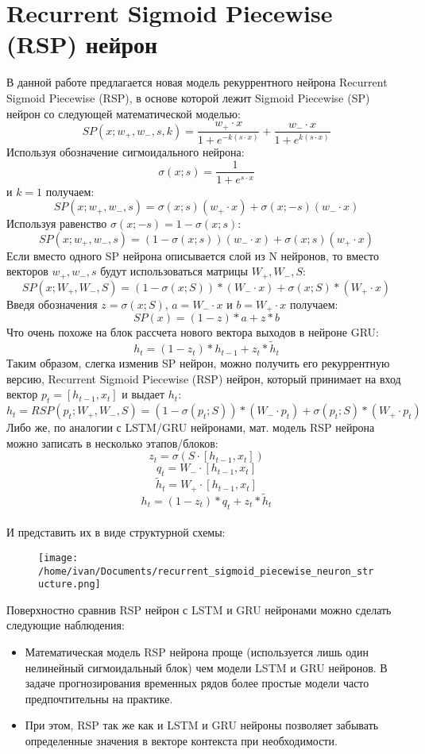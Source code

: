 \documentclass[11pt]{article}
\begin{document}
\section*{Recurrent Sigmoid Piecewise (RSP) нейрон}
В данной работе предлагается новая модель рекуррентного нейрона Recurrent Sigmoid Piecewise (RSP), в основе которой лежит Sigmoid Piecewise (SP) нейрон со следующей математической моделью:
$$ SP(x;w_+,w_-,s,k)=\frac{w_+ \cdot x}{1 + e^{-k(s \cdot x)}} + \frac{w_- \cdot x}{1 + e^{k(s \cdot x)}} $$
Используя обозначение сигмоидального нейрона:
$$\sigma(x;s)=\frac{1}{1+e^{s \cdot x}}$$
и $k=1$ получаем:
$$ SP(x;w_+,w_-,s)=\sigma(x;s)(w_+ \cdot x) + \sigma(x;-s)(w_- \cdot x) $$
Используя равенство $\sigma(x;-s)=1 - \sigma(x;s)$:
$$ SP(x;w_+,w_-,s) = (1 - \sigma(x;s))(w_- \cdot x) + \sigma(x;s)(w_+ \cdot x) $$
Если вместо одного SP нейрона описывается слой из N нейронов, то вместо векторов $w_+,w_-,s$ будут использоваться матрицы $W_+,W_-,S$:
$$ SP(x;W_+,W_-, S) = (1 - \sigma(x;S)) * (W_- \cdot x) + \sigma(x;S) * (W_+ \cdot x) $$
Введя обозначения $ z = \sigma(x;S) $, $a = W_- \cdot x$ и $b = W_+ \cdot x$ получаем:
$$ SP(x) = (1 - z) * a + z * b $$
Что очень похоже на блок рассчета нового вектора выходов в нейроне GRU:
$$ h_t = (1-z_t)*h_{t-1} + z_t*\tilde{h}_t $$
Таким образом, слегка изменив SP нейрон, можно получить его рекуррентную версию, Recurrent Sigmoid Piecewise (RSP) нейрон, который принимает на вход вектор $p_t=[h_{t-1}, x_t]$ и выдает $h_t$:
$$ h_t=RSP(p_t;W_+,W_-,S) = (1-\sigma(p_t;S))*(W_- \cdot p_t) + \sigma(p_t;S)*(W_+ \cdot p_t) $$
Либо же, по аналогии с LSTM/GRU нейронами, мат. модель RSP нейрона можно записать в несколько этапов/блоков:
$$ z_t = \sigma(S \cdot [h_{t-1}, x_t]) $$
$$ q_t = W_- \cdot [h_{t-1}, x_t] $$
$$ \tilde{h}_t = W_+ \cdot [h_{t-1}, x_t] $$
$$ h_t = (1 - z_t) * q_t + z_t * \tilde{h}_t $$
\\
И представить их в виде структурной схемы:
\\
\begin{figure}[H]
\centering
\texttt{[image: /home/ivan/Documents/recurrent\_sigmoid\_piecewise\_neuron\_structure.png]}
\label{}
\end{figure}

Поверхностно сравнив RSP нейрон с LSTM и GRU нейронами можно сделать следующие наблюдения:
\begin{itemize}
\item Математическая модель RSP нейрона проще (используется лишь один нелинейный сигмоидальный блок) чем модели LSTM и GRU нейронов. В задаче прогнозирования временных рядов более простые модели часто предпочтительны на практике.
\item При этом, RSP так же как и LSTM и GRU нейроны позволяет забывать определенные значения в векторе контекста при необходимости.
 
\end{itemize}
  
\end{document}
